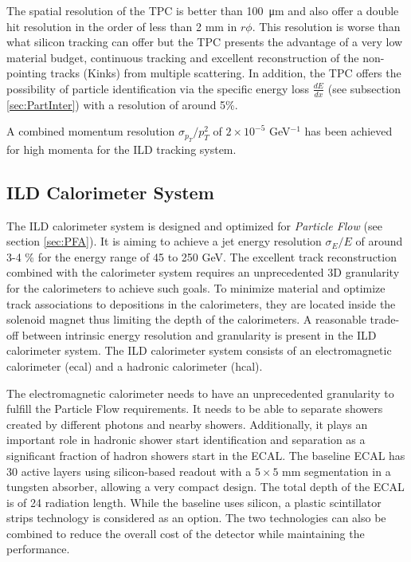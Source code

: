 The spatial resolution of the TPC is better than \SI{100}{\micro\meter} \cite{Mueller:301339} and also offer a double hit resolution in the order of less than 2 mm in $r\phi$. This resolution is worse than what silicon tracking can offer but the TPC presents the advantage of a very low material budget, continuous tracking and excellent reconstruction of the non-pointing tracks (Kinks) from multiple scattering. In addition, the TPC offers the possibility of particle identification via the specific energy loss $\frac{dE}{dx}$ (see subsection \ref{sec:PartInter}) with a resolution of around 5\%.

A combined momentum resolution $\sigma_{p_T}/p_T^2$ of $2 \times 10^{-5}$ GeV$^{-1}$ has been achieved for high momenta for the ILD tracking system.

\subsection{ILD Calorimeter System}

The ILD calorimeter system is designed and optimized for \textit{Particle Flow} (see section \ref{sec:PFA}). It is aiming to achieve a jet energy resolution $\sigma_E/E$ of around 3-4 \% for the energy range of 45 to 250 GeV. The excellent track reconstruction combined with the calorimeter system requires an unprecedented 3D granularity for the calorimeters to achieve such goals. To minimize material and optimize track associations to depositions in the calorimeters, they are located inside the solenoid magnet thus limiting the depth of the calorimeters. A reasonable trade-off between intrinsic energy resolution and granularity is present in the ILD calorimeter system. The ILD calorimeter system consists of an electromagnetic calorimeter (\acrshort{ecal}) and a hadronic calorimeter (\acrshort{hcal}).

The electromagnetic calorimeter needs to have an unprecedented granularity to fulfill the Particle Flow requirements. It needs to be able to separate showers created by different photons and nearby showers. Additionally, it plays an important role in hadronic shower start identification and separation as a significant fraction of hadron showers start in the ECAL. The baseline ECAL has 30 active layers using silicon-bas\-ed readout with a $5 \times 5$ mm segmentation in a tungsten absorber, allowing a very compact design. The total depth of the ECAL is of 24 radiation length. While the baseline uses silicon, a plastic scintillator strips technology is considered as an option. The two technologies can also be combined to reduce the overall cost of the detector while maintaining the performance.

